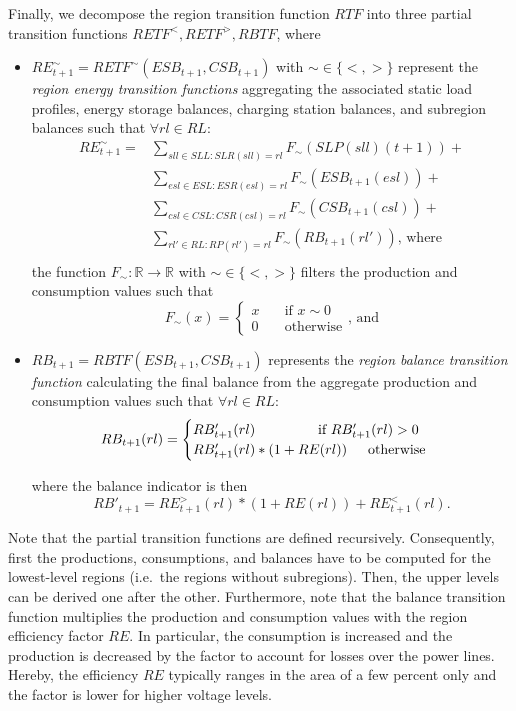 Finally, we decompose the region transition function $RTF$ into three partial transition functions $RETF^<,RETF^>,RBTF$, where
\begin{itemize}
	\item $RE_{t+1}^\sim = RETF^\sim(ESB_{t+1}, CSB_{t+1})$ with $\sim \in \{<,>\}$ represent the \textit{region energy transition functions} aggregating the associated static load profiles, energy storage balances, charging station balances, and subregion balances such that $\forall rl \in RL:$
		\begin{equation*}
		\begin{split}
		RE_{t+1}^\sim = & \sum_{sll \in SLL: SLR(sll) = rl} F_\sim(SLP(sll)(t+1)) + \\
		& \sum_{esl \in ESL: ESR(esl) = rl} F_\sim(ESB_{t+1}(esl)) + \\
		& \sum_{csl \in CSL: CSR(csl) = rl} F_\sim(CSB_{t+1}(csl)) + \\
		& \sum_{rl' \in RL: RP(rl') = rl} F_\sim(RB_{t+1}(rl')) \textrm{, where} \\
		\end{split}
		\end{equation*}
	the function $F_\sim: \mathbb{R} \rightarrow \mathbb{R}$ with $\sim \in \{<,>\}$ filters the production and consumption values such that
	\[
		F_\sim(x) = \begin{cases}
			x & \quad \textrm{if } x \sim 0 \\
			0 & \quad \textrm{otherwise}
		\end{cases}
		\textrm{, and}
	\]
	\item $RB_{t+1} = RBTF(ESB_{t+1}, CSB_{t+1})$ represents the \textit{region balance transition function} calculating the final balance from the aggregate production and consumption values such that $\forall rl \in RL:$
	\[
		RB_{t+1}(rl) = \begin{cases}
		RB'_{t+1}(rl) \qquad \qquad \enskip \textrm{if } RB'_{t+1}(rl) > 0 \\
		RB'_{t+1}(rl) * (1 + RE(rl)) \enskip \quad \textrm{otherwise}
		\end{cases}
	\]
	
	where the balance indicator is then	
	\[
		RB'_{t+1} =	RE_{t+1}^>(rl) * (1 + RE(rl)) + RE_{t+1}^<(rl) \mathrm{.}
	\]	
\end{itemize}
Note that the partial transition functions are defined recursively. Consequently, first the productions, consumptions, and balances have to be computed for the lowest-level regions (i.e.\ the regions without subregions). Then, the upper levels can be derived one after the other. Furthermore, note that the balance transition function multiplies the production and consumption values with the region efficiency factor $RE$. In particular, the consumption is increased and the production is decreased by the factor to account for losses over the power lines. Hereby, the efficiency $RE$ typically ranges in the area of a few percent only and the factor is lower for higher voltage levels.